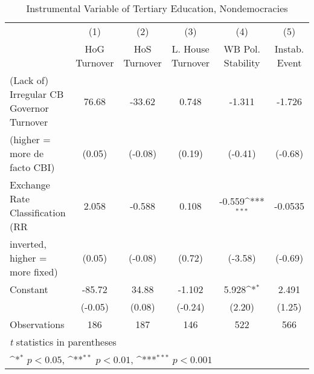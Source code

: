 \begin{table}[htbp]\centering
\def\sym#1{\ifmmode^{#1}\else\(^{#1}\)\fi}
\caption{Instrumental Variable of Tertiary Education, Nondemocracies \label{ndemIfivs2}}
\begin{tabular}{l*{5}{c}}
\toprule
                                        &\multicolumn{1}{c}{(1)}&\multicolumn{1}{c}{(2)}&\multicolumn{1}{c}{(3)}&\multicolumn{1}{c}{(4)}&\multicolumn{1}{c}{(5)}\\
                                        &\multicolumn{1}{c}{HoG Turnover}&\multicolumn{1}{c}{HoS Turnover}&\multicolumn{1}{c}{L. House Turnover}&\multicolumn{1}{c}{WB Pol. Stability}&\multicolumn{1}{c}{Instab. Event}\\
\midrule
(Lack of) Irregular CB Governor Turnover&    76.68         &   -33.62         &    0.748         &   -1.311         &   -1.726         \\
(higher = more de facto CBI)            &   (0.05)         &  (-0.08)         &   (0.19)         &  (-0.41)         &  (-0.68)         \\
\addlinespace
Exchange Rate Classification (RR        &    2.058         &   -0.588         &    0.108         &   -0.559\sym{***}&  -0.0535         \\
inverted, higher = more fixed)          &   (0.05)         &  (-0.08)         &   (0.72)         &  (-3.58)         &  (-0.69)         \\
\addlinespace
Constant                                &   -85.72         &    34.88         &   -1.102         &    5.928\sym{*}  &    2.491         \\
                                        &  (-0.05)         &   (0.08)         &  (-0.24)         &   (2.20)         &   (1.25)         \\
\midrule
Observations                            &      186         &      187         &      146         &      522         &      566         \\
\bottomrule
\multicolumn{6}{l}{\footnotesize \textit{t} statistics in parentheses}\\
\multicolumn{6}{l}{\footnotesize \sym{*} \(p<0.05\), \sym{**} \(p<0.01\), \sym{***} \(p<0.001\)}\\
\end{tabular}
\end{table}
